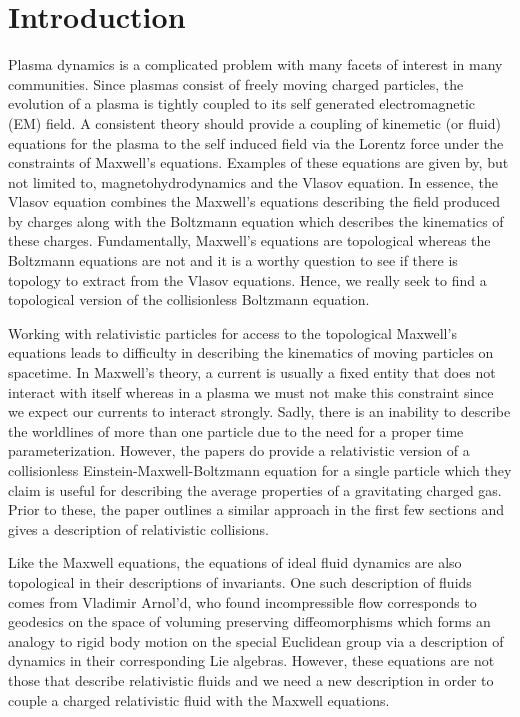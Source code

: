 \documentclass{article}
\begin{document}
\section{Introduction}
Plasma dynamics is a complicated problem with many facets of interest in many communities. Since plasmas consist of freely moving charged particles, the evolution of a plasma is tightly coupled to its self generated electromagnetic (EM) field. A consistent theory should provide a coupling of kinemetic (or fluid) equations for the plasma to the self induced field via the Lorentz force under the constraints of Maxwell's equations. Examples of these equations are given by, but not limited to, magnetohydrodynamics and the Vlasov equation. In essence, the Vlasov equation combines the Maxwell's equations describing the field produced by charges along with the Boltzmann equation which describes the kinematics of these charges. Fundamentally, Maxwell's equations are topological \cite{delphenich_axioms_2005, hehl_foundations_2003} whereas the Boltzmann equations are not and it is a worthy question to see if there is topology to extract from the Vlasov equations. Hence, we really seek to find a topological version of the collisionless Boltzmann equation.

Working with relativistic particles for access to the topological Maxwell's equations leads to difficulty in describing the kinematics of moving particles on spacetime. In Maxwell's theory, a current is usually a fixed entity that does not interact with itself whereas in a plasma we must not make this constraint since we expect our currents to interact strongly. Sadly, there is an inability to describe the worldlines of more than one particle due to the need for a proper time parameterization. However, the papers \cite{sarbach_relativistic_2013, sarbach_tangent_2014, sarbach_geometry_2014} do provide a relativistic version of a collisionless Einstein-Maxwell-Boltzmann equation for a single particle which they claim is useful for describing the average properties of a gravitating charged gas. Prior to these, the paper \cite{bichteler_cauchy_1967} outlines a similar approach in the first few sections and gives a description of relativistic collisions.

Like the Maxwell equations, the equations of ideal fluid dynamics are also topological in their descriptions of invariants. One such description of fluids comes from Vladimir Arnol'd, who found incompressible flow corresponds to geodesics on the space of voluming preserving diffeomorphisms which forms an analogy to rigid body motion on the special Euclidean group via a description of dynamics in their corresponding Lie algebras. However, these equations are not those that describe relativistic fluids and we need a new description in order to couple a charged relativistic fluid with the Maxwell equations.
\end{document}
